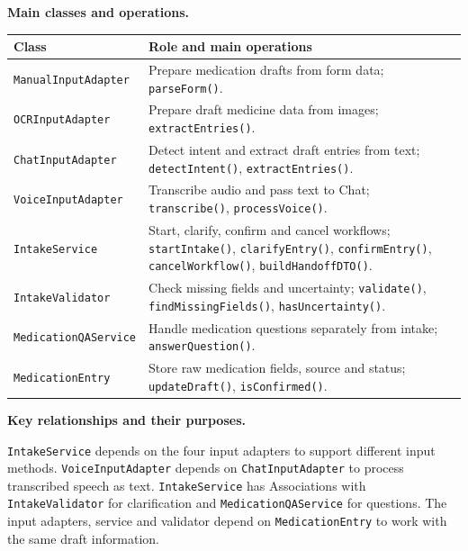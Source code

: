 \documentclass[10pt,letterpaper]{article}
\begin{document}

\noindent\textbf{Main classes and operations.}\par\smallskip
\begingroup\small
\begin{tabularx}{\textwidth}{|L{0.37\textwidth}|Y|}
\hline
\textbf{Class} & \textbf{Role and main operations} \\ \hline
\texttt{ManualInputAdapter} & Prepare medication drafts from form data; \texttt{parseForm()}. \\ \hline
\texttt{OCRInputAdapter} & Prepare draft medicine data from images; \texttt{extractEntries()}. \\ \hline
\texttt{ChatInputAdapter} & Detect intent and extract draft entries from text; \texttt{detectIntent()}, \texttt{extractEntries()}. \\ \hline
\texttt{VoiceInputAdapter} & Transcribe audio and pass text to Chat; \texttt{transcribe()}, \texttt{processVoice()}. \\ \hline
\texttt{IntakeService} & Start, clarify, confirm and cancel workflows; \texttt{startIntake()}, \texttt{clarifyEntry()}, \texttt{confirmEntry()}, \texttt{cancelWorkflow()}, \texttt{buildHandoffDTO()}. \\ \hline
\texttt{IntakeValidator} & Check missing fields and uncertainty; \texttt{validate()}, \texttt{findMissingFields()}, \texttt{hasUncertainty()}. \\ \hline
\texttt{MedicationQAService} & Handle medication questions separately from intake; \texttt{answerQuestion()}. \\ \hline
\texttt{MedicationEntry} & Store raw medication fields, source and status; \texttt{updateDraft()}, \texttt{isConfirmed()}. \\ \hline
\end{tabularx}
\endgroup

\noindent\textbf{Key relationships and their purposes.}\par\smallskip
\texttt{IntakeService} depends on the four input adapters to support
different input methods. \texttt{VoiceInputAdapter} depends on
\texttt{ChatInputAdapter} to process transcribed speech as text.
\texttt{IntakeService} has Associations with \texttt{IntakeValidator}
for clarification and \texttt{MedicationQAService} for questions.
The input adapters, service and validator depend on \texttt{MedicationEntry}
to work with the same draft information.
\end{document}
